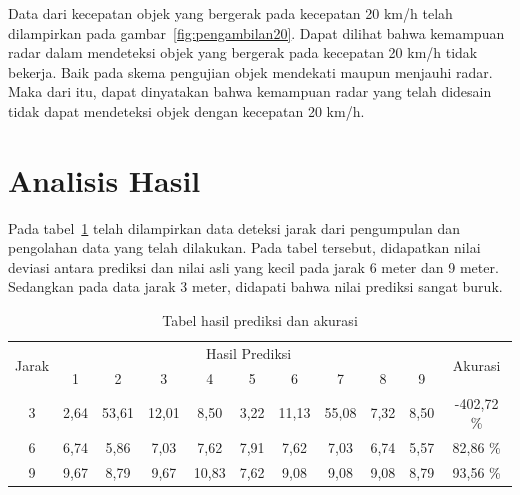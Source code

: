 Data dari kecepatan objek yang bergerak pada kecepatan 20 km/h telah dilampirkan pada gambar~\ref{fig:pengambilan20}. Dapat dilihat bahwa kemampuan radar dalam mendeteksi objek yang bergerak pada kecepatan 20 km/h tidak bekerja. Baik pada skema pengujian objek mendekati maupun menjauhi radar. Maka dari itu, dapat dinyatakan bahwa kemampuan radar yang telah didesain tidak dapat mendeteksi objek dengan kecepatan 20 km/h.

\section{Analisis Hasil}

Pada tabel~\ref{tab:estRange} telah dilampirkan data deteksi jarak dari pengumpulan dan pengolahan data yang telah dilakukan. Pada tabel tersebut, didapatkan nilai deviasi antara prediksi dan nilai asli yang kecil pada jarak 6 meter dan 9 meter. Sedangkan pada data jarak 3 meter, didapati bahwa nilai prediksi sangat buruk.

\begin{table}[H]
    \caption{Tabel hasil prediksi dan akurasi}
    \label{tab:estRange}
    \begin{tabular}{|c|ccccccccc|c|}
    \hline
    \multirow{2}{*}{Jarak} & \multicolumn{9}{c|}{Hasil Prediksi}    & \multirow{2}{*}{Akurasi} \\ \cline{2-10}
                                & \multicolumn{1}{c|}{1}    & \multicolumn{1}{c|}{2}     & \multicolumn{1}{c|}{3}     & \multicolumn{1}{c|}{4}     & \multicolumn{1}{c|}{5}    & \multicolumn{1}{c|}{6}     & \multicolumn{1}{c|}{7}     & \multicolumn{1}{c|}{8}    & 9    &                          \\ \hline
    3                           & \multicolumn{1}{c|}{2,64} & \multicolumn{1}{c|}{53,61} & \multicolumn{1}{c|}{12,01} & \multicolumn{1}{c|}{8,50}  & \multicolumn{1}{c|}{3,22} & \multicolumn{1}{c|}{11,13} & \multicolumn{1}{c|}{55,08} & \multicolumn{1}{c|}{7,32} & 8,50 & -402,72 \%               \\ \hline
    6                           & \multicolumn{1}{c|}{6,74} & \multicolumn{1}{c|}{5,86}  & \multicolumn{1}{c|}{7,03}  & \multicolumn{1}{c|}{7,62}  & \multicolumn{1}{c|}{7,91} & \multicolumn{1}{c|}{7,62}  & \multicolumn{1}{c|}{7,03}  & \multicolumn{1}{c|}{6,74} & 5,57 & 82,86 \%                 \\ \hline
    9                           & \multicolumn{1}{c|}{9,67} & \multicolumn{1}{c|}{8,79}  & \multicolumn{1}{c|}{9,67}  & \multicolumn{1}{c|}{10,83} & \multicolumn{1}{c|}{7,62} & \multicolumn{1}{c|}{9,08}  & \multicolumn{1}{c|}{9,08}  & \multicolumn{1}{c|}{9,08} & 8,79 & 93,56 \%                 \\ \hline
    \end{tabular}

    \end{table}


